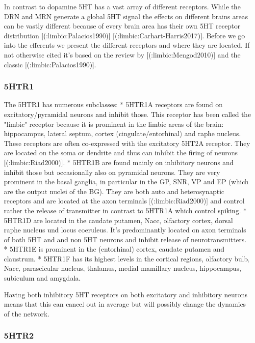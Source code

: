 {{In contrast to dopamine 5HT has a vast array of different receptors. While the DRN and MRN generate a global 5HT signal the effects on different brains areas can be vastly different because of every brain area has their own 5HT receptor distribution [(:limbic:Palacios1990)] [(:limbic:Carhart-Harris2017)]. Before we go into the efferents we present the different receptors and where they are located. If not otherwise cited it's based on the review by [(:limbic:Mengod2010)] and the classic [(:limbic:Palacios1990)].

\subsubsection{5HTR1}

The 5HTR1 has numerous subclasses:
  * 5HTR1A receptors are found on excitatory/pyramidal neurons and inhibit those. This receptor has been called the "limbic" receptor because it is prominent in the limbic areas of the brain: hippocampus, lateral septum, cortex (cingulate/entorhinal) and raphe nucleus. These receptors are often co-expressed with the excitatory 5HT2A receptor. They are located on the soma or dendrite and thus can inhibit the firing of neurons [(:limbic:Riad2000)].
  * 5HTR1B are found mainly on inhibitory neurons and inhibit those but occasionally also on pyramidal neurons. They are very prominent in the basal ganglia, in particular in the GP, SNR, VP and EP (which are the output nuclei of the BG). They are both auto and heterosynaptic receptors and are located at the axon terminals [(:limbic:Riad2000)] and control rather the release of transmitter in contrast to 5HTR1A which control spiking.
  * 5HTR1D are located in the caudate putamen, Nacc, olfactory cortex, dorsal raphe nucleus und locus coeruleus. It's predominantly located on axon terminals of both 5HT and and non 5HT neurons and inhibit release of neurotransmitters.
  * 5HTR1E is prominent in the (entorhinal) cortex, caudate putamen and claustrum.
  * 5HTR1F has its highest levels in the cortical regions, olfactory bulb, Nacc, parascicular nucleus, thalamus, medial mamillary nucleus, hippocampus, subiculum and amygdala.

Having both inhibitory 5HT receptors on both excitatory and inhibitory neurons means that this can cancel out in average but will possibly change the dynamics of the network.

\subsubsection{5HTR2}

}}
